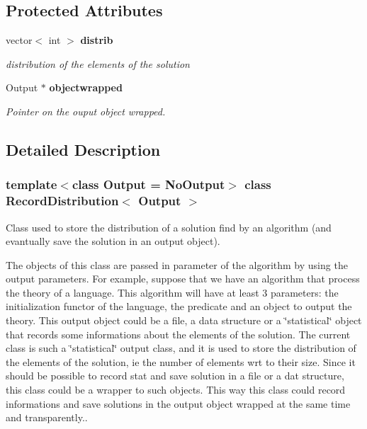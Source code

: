 \subsection*{Protected Attributes}
\begin{CompactItemize}
\item 
vector$<$ int $>$ {\bf distrib}\label{class_record_distribution_bef4620c1ab9333fea93eb5811c8b2d3}

\begin{CompactList}\small\item\em distribution of the elements of the solution \item\end{CompactList}\item 
Output $\ast$ {\bf objectwrapped}\label{class_record_distribution_e4b17eb76d6b043a0d8e637c901d3b69}

\begin{CompactList}\small\item\em Pointer on the ouput object wrapped. \item\end{CompactList}\end{CompactItemize}


\subsection{Detailed Description}
\subsubsection*{template$<$class Output = No\-Output$>$ class Record\-Distribution$<$ Output $>$}

Class used to store the distribution of a solution find by an algorithm (and evantually save the solution in an output object). 

The objects of this class are passed in parameter of the algorithm by using the output parameters. For example, suppose that we have an algorithm that process the theory of a language. This algorithm will have at least 3 parameters: the initialization functor of the language, the predicate and an object to output the theory. This output object could be a file, a data structure or a \char`\"{}statistical\char`\"{} object that records some informations about the elements of the solution. The current class is such a \char`\"{}statistical\char`\"{} output class, and it is used to store the distribution of the elements of the solution, ie the number of elements wrt to their size. Since it should be possible to record stat and save solution in a file or a dat structure, this class could be a wrapper to such objects. This way this class could record informations and save solutions in the output object wrapped at the same time and transparently.. 



